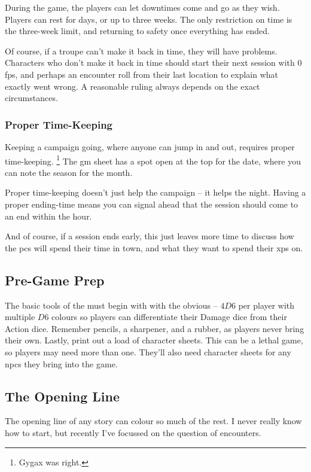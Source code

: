 \begin{multicols}{2}
During the game, the players can let downtimes come and go as they wish.
Players can rest for days, or up to three weeks.
The only restriction on time is the three-week limit, and returning to safety once everything has ended.

Of course, if a troupe can't make it back in time, they will have problems.
Characters who don't make it back in time should start their next session with 0 \glspl{fp}, and perhaps an encounter roll from their last location to explain what exactly went wrong.
A reasonable ruling always depends on the exact circumstances.

\subsubsection{Proper Time-Keeping}

Keeping a campaign going, where anyone can jump in and out, requires proper time-keeping.%
\footnote{Gygax was right.}
The \gls{gm} sheet has a spot open at the top for the date, where you can note the season for the month.

Proper time-keeping doesn't just help the campaign -- it helps the night.
Having a proper ending-time means you can signal ahead that the session should come to an end within the hour.

And of course, if a session ends early, this just leaves more time to discuss how the \glspl{pc} will spend their time in town, and what they want to spend their \glspl{xp} on.


\subsection{Pre-Game Prep}

The basic tools of the  must begin with with the obvious -- $4D6$ per player with multiple $D6$ colours so players can differentiate their Damage dice from their Action dice.
Remember pencils, a sharpener, and a rubber, as players never bring their own.
Lastly, print out a load of character sheets.
This can be a lethal game, so players may need more than one.
They'll also need character sheets for any \glspl{npc} they bring into the game.

\subsection{The Opening Line}

The opening line of any story can colour so much of the rest.
I never really know how to start, but recently I've focussed on the question of encounters.


\end{multicols}

